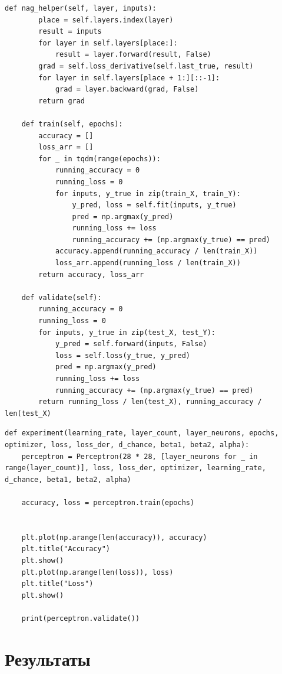 \documentclass[a4paper, 14pt]{extarticle}
\begin{document}
\begin{lstlisting}[language={},caption={Класс перцептрона},label={lst:code5}, breaklines=true]
    def nag_helper(self, layer, inputs):
        place = self.layers.index(layer)
        result = inputs
        for layer in self.layers[place:]:
            result = layer.forward(result, False)
        grad = self.loss_derivative(self.last_true, result)
        for layer in self.layers[place + 1:][::-1]:
            grad = layer.backward(grad, False)
        return grad

    def train(self, epochs):
        accuracy = []
        loss_arr = []
        for _ in tqdm(range(epochs)):
            running_accuracy = 0
            running_loss = 0
            for inputs, y_true in zip(train_X, train_Y):
                y_pred, loss = self.fit(inputs, y_true)
                pred = np.argmax(y_pred)
                running_loss += loss
                running_accuracy += (np.argmax(y_true) == pred)
            accuracy.append(running_accuracy / len(train_X))
            loss_arr.append(running_loss / len(train_X))
        return accuracy, loss_arr

    def validate(self):
        running_accuracy = 0
        running_loss = 0
        for inputs, y_true in zip(test_X, test_Y):
            y_pred = self.forward(inputs, False)
            loss = self.loss(y_true, y_pred)
            pred = np.argmax(y_pred)
            running_loss += loss
            running_accuracy += (np.argmax(y_true) == pred)
        return running_loss / len(test_X), running_accuracy / len(test_X)
\end{lstlisting}


\begin{lstlisting}[language={},caption={Функция эксперимента},label={lst:code6}, breaklines=true]
def experiment(learning_rate, layer_count, layer_neurons, epochs, optimizer, loss, loss_der, d_chance, beta1, beta2, alpha):
    perceptron = Perceptron(28 * 28, [layer_neurons for _ in range(layer_count)], loss, loss_der, optimizer, learning_rate, d_chance, beta1, beta2, alpha)

    accuracy, loss = perceptron.train(epochs)


    plt.plot(np.arange(len(accuracy)), accuracy)
    plt.title("Accuracy")
    plt.show()
    plt.plot(np.arange(len(loss)), loss)
    plt.title("Loss")
    plt.show()

    print(perceptron.validate())
\end{lstlisting}
\section{Результаты}
\end{document}
